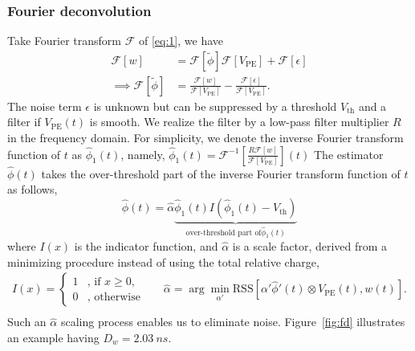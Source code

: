 \subsubsection{Fourier deconvolution}

Take Fourier transform $\mathcal{F}$ of \eqref{eq:1}, we have
\begin{equation}
  \label{eq:fourier}
  \begin{aligned}
  \mathcal{F}[w] & = \mathcal{F}[\tilde{\phi}]\mathcal{F}[V_\mathrm{PE}] + \mathcal{F}[\epsilon]\\
  \implies \mathcal{F}[\tilde{\phi}] & = \frac{\mathcal{F}[w]}{\mathcal{F}[V_\mathrm{PE}]} - \frac{\mathcal{F}[\epsilon]}{\mathcal{F}[V_\mathrm{PE}]}.
  \end{aligned}
\end{equation}
The noise term $\epsilon$ is unknown but can be suppressed by a threshold $V_\mathrm{th}$ and a filter if $V_\mathrm{PE}(t)$ is smooth. We realize the filter by a low-pass filter multiplier $R$ in the frequency domain. 
For simplicity, we denote the inverse Fourier transform function of $t$ as $\hat{\phi}_1(t)$, namely, $\hat{\phi}_1(t) = \mathcal{F}^{-1}\left[\frac{R \mathcal{F}[w]}{\mathcal{F}[V_\mathrm{PE}]}\right](t)$
The estimator $\hat{\phi}(t)$ takes the over-threshold part of the inverse Fourier transform function of $t$ as follows,
\begin{equation}
  \label{eq:fdconv2}
    \hat{\phi}(t) = \hat{\alpha}\underbrace{\hat{\phi}_1(t) I(\hat{\phi}_1(t) - V_\mathrm{th})}_{\text{over-threshold part of} \hat{\phi}_1(t)}  
\end{equation}
where $I(x)$ is the indicator function, and $\hat{\alpha}$ is a scale factor, derived from a minimizing procedure instead of using the total relative charge, 
\begin{equation}
  \begin{aligned}
  \label{eq:id}
  I(x) = \left\{
    \begin{array}{ll}
      1 & \mbox{, if $x\ge0$}, \\
      0 & \mbox{, otherwise}
    \end{array}
    \right.
    \quad~~~
    \hat{\alpha} = \arg \underset{\alpha'}{\min}\mathrm{RSS}\left[\alpha'\hat{\phi}'(t)\otimes V_\mathrm{PE}(t),w(t)\right]. \\
  \end{aligned}
\end{equation}
Such an $\hat{\alpha}$ scaling process enables us to eliminate noise. Figure~\ref{fig:fd} illustrates an example having $D_w = \SI{2.03}{ns}$. 

